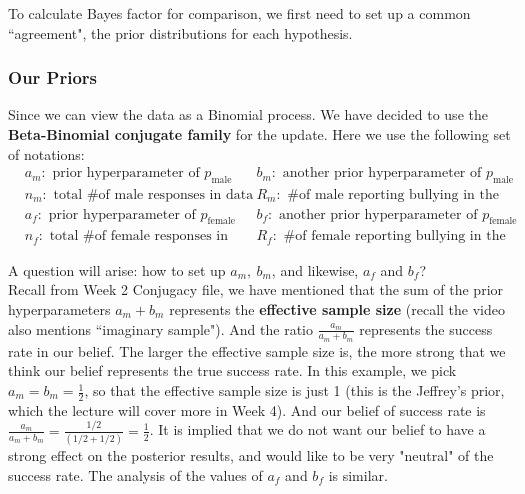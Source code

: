 \documentclass{article}
\def\dsst{\displaystyle}
\begin{document}
To calculate Bayes factor for comparison, we first need to set up a common ``agreement", the prior distributions for each hypothesis. 


\subsubsection*{Our Priors}

Since we can view the data as a Binomial process. We have decided to use the \textbf{Beta-Binomial conjugate family} for the update. Here we use the following set of notations:
\begin{align*}
& a_m: \text{ prior hyperparameter of $p_\text{male}$} & & b_m:\text{ another prior hyperparameter of $p_\text{male}$} & \\
 & n_m: \text{ total \# of male responses in data} && R_m: \text{ \# of male reporting bullying in the data} & \\
& a_f: \text{ prior hyperparameter of $p_\text{female}$} & & b_f:\text{ another prior hyperparameter of $p_\text{female}$} & \\
& n_f: \text{ total \# of female responses in data} && R_f: \text{ \# of female reporting bullying in the data} & 
\end{align*}

A question will arise: how to set up $a_m,\ b_m$, and likewise, $a_f$ and $b_f$?\\

Recall from Week 2 Conjugacy file, we have mentioned that the sum of the prior hyperparameters $a_m+b_m$ represents the \textbf{effective sample size} (recall the video also mentions ``imaginary sample"). And the ratio $\dsst \frac{a_m}{a_m+b_m}$ represents the success rate in our belief. The larger the effective sample size is, the more strong that we think our belief represents the true success rate. In this example, we pick $\dsst a_m=b_m=\frac{1}{2}$, so that the effective sample size is just 1 (this is the Jeffrey's prior, which the lecture will cover more in Week 4). And our belief of success rate is $\dsst \frac{a_m}{a_m+b_m} = \frac{1/2}{(1/2 + 1/2)} = \frac{1}{2}$. It is implied that we do not want our belief to have a strong effect on the posterior results, and would like to be very "neutral" of the success rate. The analysis of the values of $a_f$ and $b_f$ is similar.\\
\end{document}
